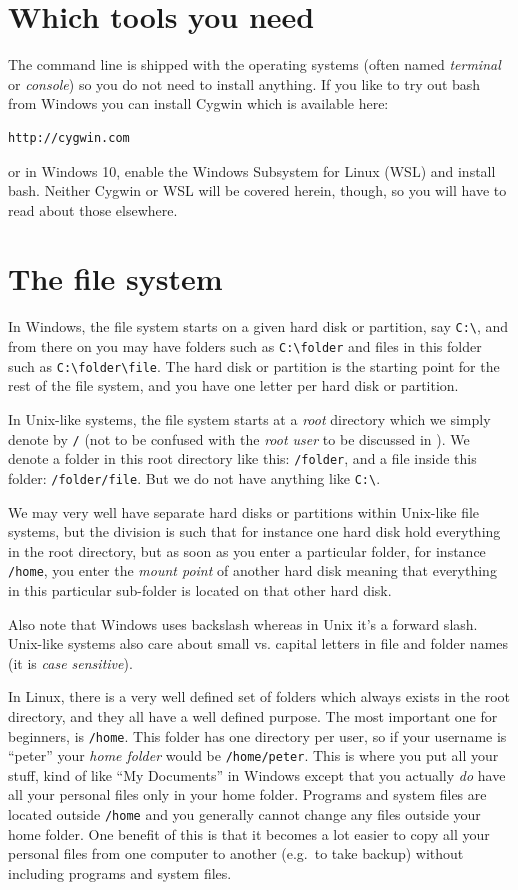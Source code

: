 \section{Which tools you need}
The command line is shipped with the operating systems (often named \emph{terminal} or \emph{console}) so you do not need to install anything. If you like to try out bash from Windows you can install Cygwin which is available here:

\begin{verbatim}
http://cygwin.com
\end{verbatim}
or in Windows 10, enable the Windows Subsystem for Linux (WSL) and install bash. Neither Cygwin or WSL will be covered herein, though, so you will have to read about those elsewhere.

\section{The file system}
In Windows, the file system starts on a given hard disk or partition, say \verb|C:\|, and from there on you may have folders such as \verb|C:\folder| and files in this folder such as \verb|C:\folder\file|. The hard disk or partition is the starting point for the rest of the file system, and you have one letter per hard disk or partition.

In Unix-like systems, the file system starts at a \emph{root} directory which we simply denote by \verb|/| (not to be confused with the \emph{root user} to be discussed in ). We denote a folder in this root directory like this: \verb|/folder|, and a file inside this folder: \verb|/folder/file|. But we do not have anything like \verb|C:\|. 

We may very well have separate hard disks or partitions within Unix-like file systems, but the division is such that for instance one hard disk hold everything in the root directory, but as soon as you enter a particular folder, for instance \verb|/home|, you enter the \emph{mount point} of another hard disk meaning that everything in this particular sub-folder is located on that other hard disk.

Also note that Windows uses backslash whereas in Unix it's a forward slash. Unix-like systems also care about small vs. capital letters in file and folder names (it is \emph{case sensitive}).

In Linux, there is a very well defined set of folders which always exists in the root directory, and they all have a well defined purpose. The most important one for beginners, is \verb|/home|. This folder has one directory per user, so if your username is ``peter'' your \emph{home folder} would be \verb|/home/peter|. This is where you put all your stuff, kind of like ``My Documents'' in Windows except that you actually \emph{do} have all your personal files only in your home folder. Programs and system files are located outside \verb|/home| and you generally cannot change any files outside your home folder. One benefit of this is that it becomes a lot easier to copy all your personal files from one computer to another (e.g.\ to take backup) without including programs and system files.

